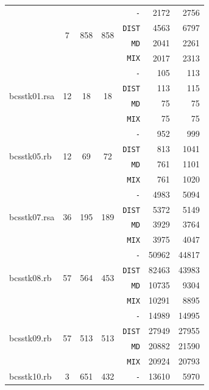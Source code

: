 \documentclass{ctuthesis}
\theoremstyle{plain}
\theoremstyle{definition}
\begin{document}
{\begin{longtable}{|l|c|c|c|r|r|r|}
    &	\multirow{4}{*}{7}	&	\multirow{4}{*}{858}	&	\multirow{4}{*}{858}	&\texttt{-}    &	2172	&	2756	\\
    & & & &\texttt{DIST} &	4563	&	6797	\\
    & & & &\texttt{MD}   &	2041	&	2261	\\
    & & & &\texttt{MIX}  &	2017	&	2313	\\
    \hline
  \multirow{4}{*}{bcsstk01.rsa	}
    &	\multirow{4}{*}{12}	&	\multirow{4}{*}{18}	&	\multirow{4}{*}{18}	&\texttt{-}    &	105	&	113	\\
    & & & &\texttt{DIST} &	113	&	115	\\
    & & & &\texttt{MD}   &	75	&	75	\\
    & & & &\texttt{MIX}  &	75	&	75	\\
    \hline
  \multirow{4}{*}{bcsstk05.rb	}
    &	\multirow{4}{*}{12}	&	\multirow{4}{*}{69}	&	\multirow{4}{*}{72}	&\texttt{-}    &	952	&	999	\\
    & & & &\texttt{DIST} &	813	&	1041	\\
    & & & &\texttt{MD}   &	761	&	1101	\\
    & & & &\texttt{MIX}  &	761	&	1020	\\
    \hline
  \multirow{4}{*}{bcsstk07.rsa	}
    &	\multirow{4}{*}{36}	&	\multirow{4}{*}{195}	&	\multirow{4}{*}{189}	&\texttt{-}    &	4983	&	5094	\\
    & & & &\texttt{DIST} &	5372	&	5149	\\
    & & & &\texttt{MD}   &	3929	&	3764	\\
    & & & &\texttt{MIX}  &	3975	&	4047	\\
    \hline
  \multirow{4}{*}{bcsstk08.rb	}
    &	\multirow{4}{*}{57}	&	\multirow{4}{*}{564}	&	\multirow{4}{*}{453}	&\texttt{-}    &	50962	&	44817	\\
    & & & &\texttt{DIST} &	82463	&	43983	\\
    & & & &\texttt{MD}   &	10735	&	9304	\\
    & & & &\texttt{MIX}  &	10291	&	8895	\\
    \hline
  \multirow{4}{*}{bcsstk09.rb	}
    &	\multirow{4}{*}{57}	&	\multirow{4}{*}{513}	&	\multirow{4}{*}{513}	&\texttt{-}    &	14989	&	14995	\\
    & & & &\texttt{DIST} &	27949	&	27955	\\
    & & & &\texttt{MD}   &	20882	&	21590	\\
    & & & &\texttt{MIX}  &	20924	&	20793	\\
    \hline
  \multirow{4}{*}{bcsstk10.rb	}
    &	\multirow{4}{*}{3}	&	\multirow{4}{*}{651}	&	\multirow{4}{*}{432}	&\texttt{-}    &	13610	&	5970	\\

\end{longtable}}
\end{document}
